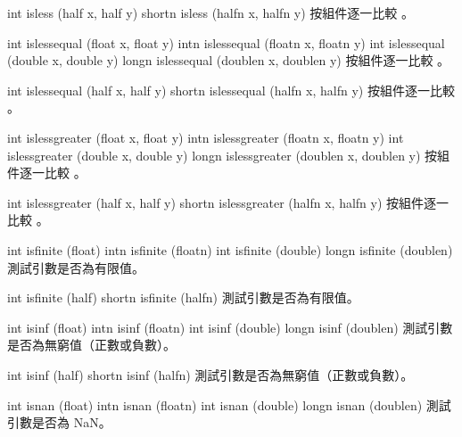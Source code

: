 int isless (half x, half y)
shortn isless (halfn x, halfn y)
\stopbuffer
{}
按組件逐一比較 。
\stopbuffer

int islessequal (float x, float y)
intn islessequal (floatn x, floatn y)
int islessequal (double x, double y)
longn islessequal (doublen x, doublen y)
\stopbuffer
{}
按組件逐一比較 。
\stopbuffer

int islessequal (half x, half y)
shortn islessequal (halfn x, halfn y)
\stopbuffer
{}
按組件逐一比較 。
\stopbuffer

int islessgreater (float x, float y)
intn islessgreater (floatn x, floatn y)
int islessgreater (double x, double y)
longn islessgreater (doublen x, doublen y)
\stopbuffer
{}
按組件逐一比較 。
\stopbuffer

int islessgreater (half x, half y)
shortn islessgreater (halfn x, halfn y)
\stopbuffer
{}
按組件逐一比較 。
\stopbuffer

int isfinite (float)
intn isfinite (floatn)
int isfinite (double)
longn isfinite (doublen)
\stopbuffer
{}
測試引數是否為有限值。
\stopbuffer

int isfinite (half)
shortn isfinite (halfn)
\stopbuffer
{}
測試引數是否為有限值。
\stopbuffer

int isinf (float)
intn isinf (floatn)
int isinf (double)
longn isinf (doublen)
\stopbuffer
{}
測試引數是否為無窮值（正數或負數）。
\stopbuffer

int isinf (half)
shortn isinf (halfn)
\stopbuffer
{}
測試引數是否為無窮值（正數或負數）。
\stopbuffer

int isnan (float)
intn isnan (floatn)
int isnan (double)
longn isnan (doublen)
\stopbuffer
{}
測試引數是否為 NaN。
\stopbuffer

